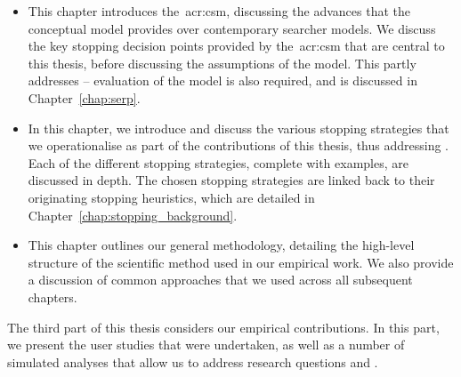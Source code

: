 \begin{itemize}
    \item[]{ This chapter introduces the~\gls{acr:csm}, discussing the advances that the conceptual model provides over contemporary searcher models. We discuss the key stopping decision points provided by the~\gls{acr:csm} that are central to this thesis, before discussing the assumptions of the model. This partly addresses  -- evaluation of the model is also required, and is discussed in Chapter~\ref{chap:serp}.}
    
    \item[]{ In this chapter, we introduce and discuss the various stopping strategies that we operationalise as part of the contributions of this thesis, thus addressing . Each of the different stopping strategies, complete with examples, are discussed in depth. The chosen stopping strategies are linked back to their originating stopping heuristics, which are detailed in Chapter~\ref{chap:stopping_background}.}
    
    \item[]{ This chapter outlines our general methodology, detailing the high-level structure of the scientific method used in our empirical work. We also provide a discussion of common approaches that we used across all subsequent chapters.}
\end{itemize}

\noindent
{}
The third part of this thesis considers our empirical contributions. In this part, we present the user studies that were undertaken, as well as a number of simulated analyses that allow us to address research questions  and .

